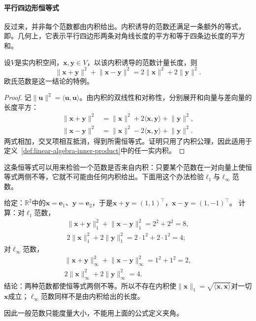 \paragraph{平行四边形恒等式}
反过来，并非每个范数都由内积给出。内积诱导的范数还满足一条额外的等式，即。几何上，它表示平行四边形两条对角线长度的平方和等于四条边长度的平方和。
\begin{theorem}[平行四边形恒等式]
\label{thm:linear-algebra-parallelogram}
设$V$是实内积空间，$\bm x,\bm y\in V$，以该内积诱导的范数计量长度，则
\begin{equation}
 \lVert\bm x+\bm y\rVert^2+\lVert\bm x-\bm y\rVert^2
 =2\lVert\bm x\rVert^2+2\lVert\bm y\rVert^2.
 \label{eq:functional-parallelogram-identity}
\end{equation}
欧氏范数是这一结论的特例。
\end{theorem}
\begin{proof}
记$\lVert\bm u\rVert^2=\langle\bm u,\bm u\rangle$。由内积的双线性和对称性，分别展开和向量与差向量的长度平方：
\[
 \begin{aligned}
 \lVert\bm x+\bm y\rVert^2
 &=\lVert\bm x\rVert^2+2\langle\bm x,\bm y\rangle+\lVert\bm y\rVert^2,\\
 \lVert\bm x-\bm y\rVert^2
 &=\lVert\bm x\rVert^2-2\langle\bm x,\bm y\rangle+\lVert\bm y\rVert^2.
 \end{aligned}
\]
两式相加，交叉项相互抵消，得到所需恒等式。证明只用了内积公理，因此适用于定义~\ref{def:linear-algebra-inner-product}中的任一实内积。
\end{proof}

这条恒等式可以用来检验一个范数是否来自内积：只要某个范数在一对向量上使恒等式两侧不等，它就不可能由任何内积给出。下面用这个办法检验$\ell_1$与$\ell_\infty$范数。
\begin{example}
\label{ex:ls-l1-linf-not-inner-product}
给定：$\mathbb R^2$中的$\bm x=\bm e_1$、$\bm y=\bm e_2$，于是$\bm x+\bm y=(1,1)^\top$，$\bm x-\bm y=(1,-1)^\top$。
计算：对$\ell_1$范数，
\[
 \begin{gathered}
 \lVert\bm x+\bm y\rVert_1^2+\lVert\bm x-\bm y\rVert_1^2=2^2+2^2=8,\\
 2\lVert\bm x\rVert_1^2+2\lVert\bm y\rVert_1^2=2\cdot1^2+2\cdot1^2=4;
 \end{gathered}
\]
对$\ell_\infty$范数，
\[
 \begin{gathered}
 \lVert\bm x+\bm y\rVert_\infty^2+\lVert\bm x-\bm y\rVert_\infty^2=1^2+1^2=2,\\
 2\lVert\bm x\rVert_\infty^2+2\lVert\bm y\rVert_\infty^2=4.
 \end{gathered}
\]
结论：两种范数都使恒等式两侧不等。所以不存在内积使$\lVert\bm x\rVert_1=\sqrt{\langle\bm x,\bm x\rangle}$对一切$\bm x$成立；$\ell_\infty$范数同样不是由内积给出的长度。
\end{example}
因此一般范数只能度量大小，不能用上面的公式定义夹角。

